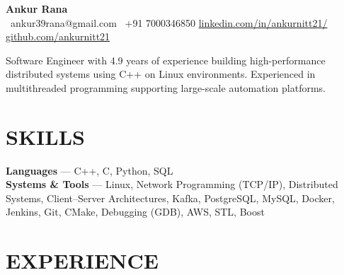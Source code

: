\documentclass[11.9pt,a4paper]{article}
\begin{document}
\begin{center}
  {\Large \textbf{Ankur Rana}}\\[7pt]
  {\small
    \Letter\ ankur39rana@gmail.com \enspace\textbar\enspace
    \phone\ +91 7000346850 \enspace\textbar\enspace
    \href{https://www.linkedin.com/in/ankurnitt21/}{linkedin.com/in/ankurnitt21/} \enspace\textbar\enspace
    \href{https://github.com/ankurnitt21}{github.com/ankurnitt21}
  }
\end{center}

\vspace{8pt}

Software Engineer with 4.9 years of experience building high-performance distributed systems using C++ on Linux environments. Experienced in multithreaded programming supporting large-scale automation platforms.

\vspace{8pt}

\section*{SKILLS}

\noindent
\textbf{Languages} --- C++, C, Python, SQL\\[3pt]
\textbf{Systems \& Tools} --- Linux, Network Programming (TCP/IP), Distributed Systems, Client--Server Architectures, Kafka, PostgreSQL, MySQL, Docker, Jenkins, Git, CMake, Debugging (GDB), AWS, STL, Boost

\vspace{6pt}

\section*{EXPERIENCE}
\end{document}
